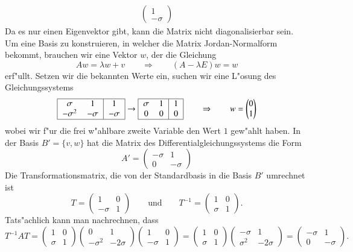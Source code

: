 \begin{beispiel}
\begin{align*}
\begin{pmatrix}
1\\-\sigma
\end{pmatrix}
\end{align*}
Da es nur einen Eigenvektor gibt, kann die Matrix nicht diagonalisierbar
sein.
Um eine Basis zu konstruieren, in welcher die Matrix Jordan-Normalform
bekommt, brauchen wir eine Vektor $w$, der die Gleichung
\[
Aw = \lambda w + v
\qquad\Rightarrow\qquad
(A-\lambda E)w=w
\]
erf"ullt.
Setzen wir die bekannten Werte ein, suchen wir eine L"osung des
Gleichungssystems
\[
\begin{tabular}{|>{$}c<{$}>{$}c<{$}|>{$}c<{$}|}
\hline
 \sigma  &    1    & 1 \\
-\sigma^2& -\sigma & -\sigma\\
\hline
\end{tabular}
\rightarrow
\begin{tabular}{|>{$}c<{$}>{$}c<{$}|>{$}c<{$}|}
\hline
 \sigma  &    1    & 1 \\
     0   &    0    & 0 \\
\hline
\end{tabular}
\qquad
\Rightarrow
\qquad
w=\begin{pmatrix}
0\\1
\end{pmatrix}
\]
wobei wir f"ur die frei w"ahlbare zweite Variable den Wert $1$ gew"ahlt haben.
In der Basis $B'=\{v, w\}$ hat die Matrix des Differentialgleichungssystems
die Form
\[
A'
=
\begin{pmatrix}
-\sigma&      1\\
      0&-\sigma 
\end{pmatrix}
\]
Die Transformationsmatrix, die von der Standardbasis in die Basis $B'$
umrechnet ist
\[
T
=
\begin{pmatrix}
      1&0\\
-\sigma&1
\end{pmatrix}
\qquad\text{und}\qquad
T^{-1}
=
\begin{pmatrix}
     1&0\\
\sigma&1
\end{pmatrix}.
\]
Tats"achlich kann man nachrechnen, dass
\[
T^{-1}AT
=
\begin{pmatrix}
     1&0\\
\sigma&1
\end{pmatrix}
\begin{pmatrix}
0&1\\
-\sigma^2&-2\sigma
\end{pmatrix}
\begin{pmatrix}
      1&0\\
-\sigma&1
\end{pmatrix}
=
\begin{pmatrix}
     1&0\\
\sigma&1
\end{pmatrix}
\begin{pmatrix}
-\sigma  &1\\
 \sigma^2&-2\sigma
\end{pmatrix}
=
\begin{pmatrix}
-\sigma&1\\
      0&-\sigma
\end{pmatrix}.
\]


\end{beispiel}
